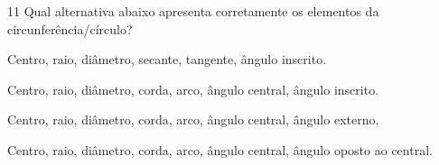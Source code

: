 

\num{11} Qual alternativa abaixo apresenta corretamente os elementos da
circunferência/círculo?

\begin{escolha}
\item Centro, raio, diâmetro, secante, tangente, ângulo inscrito.
\item Centro, raio, diâmetro, corda, arco, ângulo central, ângulo inscrito.
\item Centro, raio, diâmetro, corda, arco, ângulo central, ângulo externo.
\item Centro, raio, diâmetro, corda, arco, ângulo central, ângulo oposto ao
central.
\end{escolha}



